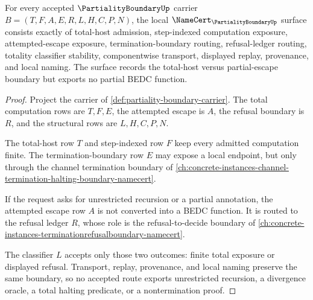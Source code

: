 \begin{theorem}
\label{thm:partiality-boundary-namecert-obligations}
For every accepted $\PartialityBoundaryUp$ carrier $B=(T,F,A,E,R,L,H,C,P,N)$, the local $\NameCert_{\PartialityBoundaryUp}$ surface consists exactly of total-host admission, step-indexed computation exposure, attempted-escape exposure, termination-boundary routing, refusal-ledger routing, totality classifier stability, componentwise transport, displayed replay, provenance, and local naming. The surface records the total-host versus partial-escape boundary but exports no partial BEDC function.
\end{theorem}
\begin{proof}
Project the carrier of \autoref{def:partiality-boundary-carrier}. The total computation rows are $T,F,E$, the attempted escape is $A$, the refusal boundary is $R$, and the structural rows are $L,H,C,P,N$.

The total-host row $T$ and step-indexed row $F$ keep every admitted computation finite. The termination-boundary row $E$ may expose a local endpoint, but only through the channel termination boundary of \autoref{ch:concrete-instances-channel-termination-halting-boundary-namecert}.

If the request asks for unrestricted recursion or a partial annotation, the attempted escape row $A$ is not converted into a BEDC function. It is routed to the refusal ledger $R$, whose role is the refusal-to-decide boundary of \autoref{ch:concrete-instances-terminationrefusalboundary-namecert}.

The classifier $L$ accepts only those two outcomes: finite total exposure or displayed refusal. Transport, replay, provenance, and local naming preserve the same boundary, so no accepted route exports unrestricted recursion, a divergence oracle, a total halting predicate, or a nontermination proof.
\end{proof}


